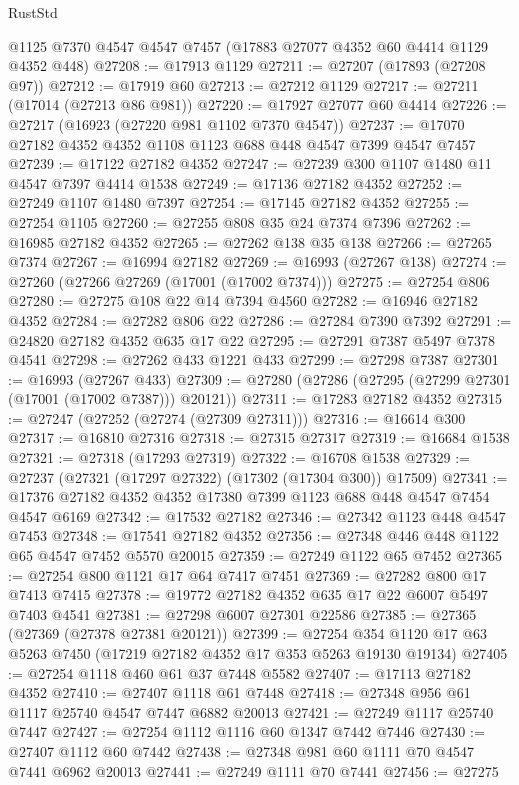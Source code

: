 \begin{lexlean}{RustStd}
\begin{coremodule}
    @1125
    @7370
    @4547
    @4547
    @7457
    (@17883 @27077 @4352 @60 @4414 @1129 @4352 @448)
@27208 := @17913 @1129
@27211 := @27207 (@17893 (@27208 @97))
@27212 := @17919 @60
@27213 := @27212 @1129
@27217 := @27211 (@17014 (@27213 @86 @981))
@27220 := @17927 @27077 @60 @4414
@27226 := @27217 (@16923 (@27220 @981 @1102 @7370 @4547))
@27237 := @17070 @27182 @4352 @4352 @1108 @1123 @688 @448 @4547 @7399 @4547 @7457
@27239 := @17122 @27182 @4352
@27247 := @27239 @300 @1107 @1480 @11 @4547 @7397 @4414 @1538
@27249 := @17136 @27182 @4352
@27252 := @27249 @1107 @1480 @7397
@27254 := @17145 @27182 @4352
@27255 := @27254 @1105
@27260 := @27255 @808 @35 @24 @7374 @7396
@27262 := @16985 @27182 @4352
@27265 := @27262 @138 @35 @138
@27266 := @27265 @7374
@27267 := @16994 @27182
@27269 := @16993 (@27267 @138)
@27274 := @27260 (@27266 @27269 (@17001 (@17002 @7374)))
@27275 := @27254 @806
@27280 := @27275 @108 @22 @14 @7394 @4560
@27282 := @16946 @27182 @4352
@27284 := @27282 @806 @22
@27286 := @27284 @7390 @7392
@27291 := @24820 @27182 @4352 @635 @17 @22
@27295 := @27291 @7387 @5497 @7378 @4541
@27298 := @27262 @433 @1221 @433
@27299 := @27298 @7387
@27301 := @16993 (@27267 @433)
@27309 := @27280 (@27286 (@27295 (@27299 @27301 (@17001 (@17002 @7387))) @20121))
@27311 := @17283 @27182 @4352
@27315 := @27247 (@27252 (@27274 (@27309 @27311)))
@27316 := @16614 @300
@27317 := @16810 @27316
@27318 := @27315 @27317
@27319 := @16684 @1538
@27321 := @27318 (@17293 @27319)
@27322 := @16708 @1538
@27329 := @27237 (@27321 (@17297 @27322) (@17302 (@17304 @300)) @17509)
@27341 := @17376 @27182 @4352 @4352 @17380 @7399 @1123 @688 @448 @4547 @7454 @4547 @6169
@27342 := @17532 @27182
@27346 := @27342 @1123 @448 @4547 @7453
@27348 := @17541 @27182 @4352
@27356 := @27348 @446 @448 @1122 @65 @4547 @7452 @5570 @20015
@27359 := @27249 @1122 @65 @7452
@27365 := @27254 @800 @1121 @17 @64 @7417 @7451
@27369 := @27282 @800 @17 @7413 @7415
@27378 := @19772 @27182 @4352 @635 @17 @22 @6007 @5497 @7403 @4541
@27381 := @27298 @6007 @27301 @22586
@27385 := @27365 (@27369 (@27378 @27381 @20121))
@27399 := @27254 @354 @1120 @17 @63 @5263 @7450 (@17219 @27182 @4352 @17 @353 @5263 @19130 @19134)
@27405 := @27254 @1118 @460 @61 @37 @7448 @5582
@27407 := @17113 @27182 @4352
@27410 := @27407 @1118 @61 @7448
@27418 := @27348 @956 @61 @1117 @25740 @4547 @7447 @6882 @20013
@27421 := @27249 @1117 @25740 @7447
@27427 := @27254 @1112 @1116 @60 @1347 @7442 @7446
@27430 := @27407 @1112 @60 @7442
@27438 := @27348 @981 @60 @1111 @70 @4547 @7441 @6962 @20013
@27441 := @27249 @1111 @70 @7441
@27456 := @27275

\end{coremodule}
\end{lexlean}
